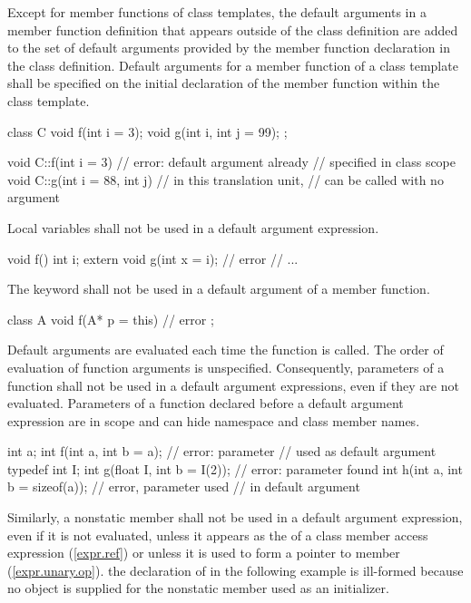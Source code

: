 \pnum
Except for member functions of class templates, the
default arguments in a member function definition that appears
outside of the class definition
are added to the set of default arguments provided by the
member function declaration in the class definition.
Default arguments for a member function of a class template
shall be specified on the initial declaration of the member
function within the class template.
\enterexample

\begin{codeblock}
class C {
	void f(int i = 3);
	void g(int i, int j = 99);
};

void C::f(int i = 3)            // error: default argument already
{ }                             // specified in class scope
void C::g(int i = 88, int j)    // in this translation unit,
{ }                             //  can be called with no argument
\end{codeblock}
\exitexampleb

\pnum
Local variables shall not be used in a default argument expression.
\enterexample

\begin{codeblock}
void f()
{
    int i;
    extern void g(int x = i);   // error
    // ...
}
\end{codeblock}
\exitexampleb

\pnum
The keyword
shall not be used in a default argument of a member function.
\enterexample

\begin{codeblock}
class A {
    void f(A* p = this) { }     // error
};
\end{codeblock}
\exitexampleb

\pnum
{}%
Default arguments are evaluated each time the function is called.
The order of evaluation of function arguments is
unspecified.
%
%
Consequently,
parameters of a function shall not be used in a default argument expressions,
even if they are not evaluated.
%
Parameters of a function declared before a default argument expression
are in scope and can hide namespace and class member names.
\enterexample

\begin{codeblock}
int a;
int f(int a, int b = a);		// error: parameter 
					// used as default argument
typedef int I;
int g(float I, int b = I(2));		// error: parameter  found
int h(int a, int b = sizeof(a));	// error, parameter  used
					// in default argument
\end{codeblock}
\exitexampleb
Similarly, a nonstatic member shall not be used in a default argument
expression, even if it is not evaluated, unless it appears as
the  of a class member access expression (\ref{expr.ref}) or
unless it is used to form a pointer to member (\ref{expr.unary.op}).
\enterexample
the declaration of
in the following example is ill-formed because no object is supplied for the
nonstatic member
used as an initializer.

